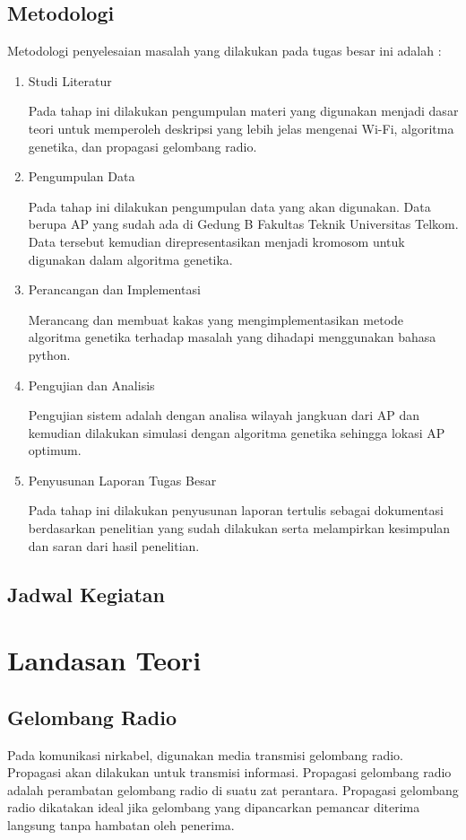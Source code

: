 \documentclass[12pt,a4paper]{report}
\begin{document}
		\section{Metodologi}
		Metodologi penyelesaian masalah yang dilakukan pada tugas besar ini adalah :
		\begin{enumerate}
			\item Studi Literatur
			
			Pada tahap ini dilakukan pengumpulan materi yang digunakan menjadi dasar teori untuk memperoleh deskripsi yang lebih jelas mengenai Wi-Fi, algoritma genetika, dan propagasi gelombang radio.
			
			\item Pengumpulan Data
			
			Pada tahap ini dilakukan pengumpulan data yang akan digunakan. Data berupa AP yang sudah ada di Gedung B Fakultas Teknik Universitas Telkom. Data tersebut kemudian direpresentasikan menjadi kromosom untuk  digunakan dalam algoritma genetika.
			
			\item Perancangan dan Implementasi
			
			Merancang dan membuat kakas yang mengimplementasikan metode algoritma genetika terhadap masalah yang dihadapi menggunakan bahasa python.
			
			\item Pengujian dan Analisis
			
			Pengujian sistem adalah dengan analisa wilayah jangkuan dari AP dan kemudian dilakukan simulasi dengan  algoritma genetika sehingga lokasi AP optimum.
			
			\item Penyusunan Laporan Tugas Besar
			
			Pada tahap ini dilakukan penyusunan laporan tertulis sebagai dokumentasi berdasarkan penelitian yang sudah dilakukan serta melampirkan kesimpulan dan saran dari hasil penelitian.
		\end{enumerate}
		
		
		\section{Jadwal Kegiatan}
		\newpage
		\chapter{Landasan Teori}
		\section{Gelombang Radio}
		Pada komunikasi nirkabel, digunakan media transmisi gelombang radio. Propagasi akan dilakukan untuk transmisi informasi. Propagasi gelombang radio adalah perambatan gelombang radio di suatu zat perantara. Propagasi gelombang radio dikatakan ideal jika gelombang yang dipancarkan pemancar diterima langsung tanpa hambatan oleh penerima.
\end{document}
